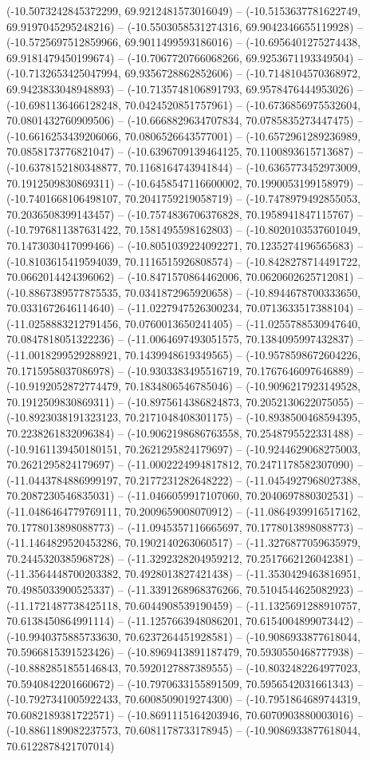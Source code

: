 (-10.5073242845372299, 69.9212481573016049) -- (-10.5153637781622749, 69.9197045295248216) -- (-10.5503058531274316, 69.9042346655119928) -- (-10.5725697512859966, 69.9011499593186016) -- (-10.6956401275274438, 69.9181479450199674) -- (-10.7067720766068266, 69.9253671193349504) -- (-10.7132653425047994, 69.9356728862852606) -- (-10.7148104570368972, 69.9423833048948893) -- (-10.7135748106891793, 69.9578476444953026) -- (-10.6981136466128248, 70.0424520851757961) -- (-10.6736856975532604, 70.0801432760909506) -- (-10.6668829634707834, 70.0785835273447475) -- (-10.6616253439206066, 70.0806526643577001) -- (-10.6572961289236989, 70.0858173776821047) -- (-10.6396709139464125, 70.1100893615713687) -- (-10.6378152180348877, 70.1168164743941844) -- (-10.6365773452973009, 70.1912509830869311) -- (-10.6458547116600002, 70.1990053199158979) -- (-10.7401668106498107, 70.2041759219058719) -- (-10.7478979492855053, 70.2036508399143457) -- (-10.7574836706376828, 70.1958941847115767) -- (-10.7976811387631422, 70.1581495598162803) -- (-10.8020103537601049, 70.1473030417099466) -- (-10.8051039224092271, 70.1235274196565683) -- (-10.8103615419594039, 70.1116515926808574) -- (-10.8428278714491722, 70.0662014424396062) -- (-10.8471570864462006, 70.0620602625712081) -- (-10.8867389577875535, 70.0341872965920658) -- (-10.8944678700333650, 70.0331672646114640) -- (-11.0227947526300234, 70.0713633517388104) -- (-11.0258883212791456, 70.0760013650241405) -- (-11.0255788530947640, 70.0847818051322236) -- (-11.0064697493051575, 70.1384095997432837) -- (-11.0018299529288921, 70.1439948619349565) -- (-10.9578598672604226, 70.1715958037086978) -- (-10.9303383495516719, 70.1767646097646889) -- (-10.9192052872774479, 70.1834806546785046) -- (-10.9096217923149528, 70.1912509830869311) -- (-10.8975614386824873, 70.2052130622075055) -- (-10.8923038191323123, 70.2171048408301175) -- (-10.8938500468594395, 70.2238261832096384) -- (-10.9062198686763558, 70.2548795522331488) -- (-10.9161139450180151, 70.2621295824179697) -- (-10.9244629068275003, 70.2621295824179697) -- (-11.0002224994817812, 70.2471178582307090) -- (-11.0443784886999197, 70.2177231282648222) -- (-11.0454927968027388, 70.2087230546835031) -- (-11.0466059917107060, 70.2040697880302531) -- (-11.0486464779769111, 70.2009659008070912) -- (-11.0864939916517162, 70.1778013898088773) -- (-11.0945357116665697, 70.1778013898088773) -- (-11.1464829520453286, 70.1902140263060517) -- (-11.3276877059635979, 70.2445320385968728) -- (-11.3292328204959212, 70.2517662126042381) -- (-11.3564448700203382, 70.4928013827421438) -- (-11.3530429463816951, 70.4985033900525337) -- (-11.3391268968376266, 70.5104544625082923) -- (-11.1721487738425118, 70.6044908539190459) -- (-11.1325691288910757, 70.6138450864991114) -- (-11.1257663948086201, 70.6154004899073442) -- (-10.9940375885733630, 70.6237264451928581) -- (-10.9086933877618044, 70.5966815391523426) -- (-10.8969413891187479, 70.5930550468777938) -- (-10.8882851855146843, 70.5920127887389555) -- (-10.8032482264977023, 70.5940842201660672) -- (-10.7970633155891509, 70.5956542031661343) -- (-10.7927341005922433, 70.6008509019274300) -- (-10.7951864689744319, 70.6082189381722571) -- (-10.8691115164203946, 70.6070903880003016) -- (-10.8861189082237573, 70.6081178733178945) -- (-10.9086933877618044, 70.6122878421707014) 